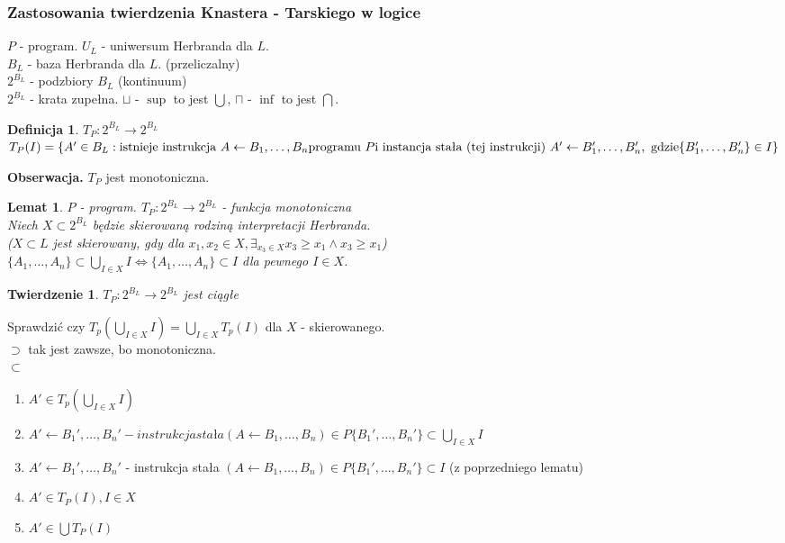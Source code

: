 \documentclass[10pt,a4paper]{article}
\theoremstyle{plain}
\newtheorem{theorem}{Twierdzenie}
\newtheorem{lemma}{Lemat}
\theoremstyle{definition}
\newtheorem*{definition}{Definicja}
\newcommand{\header}[1]{\noindent\textbf{#1}}
\begin{document}
\subsubsection{Zastosowania twierdzenia Knastera - Tarskiego w logice}
$P$ - program. $U_L$ - uniwersum Herbranda dla  $L$.\\
$B_L$ - baza Herbranda dla $L$. (przeliczalny)\\
$2^{B_L}$ - podzbiory $B_L$ (kontinuum)\\
$2^{B_L}$ - krata zupełna. $\sqcup$ - $\sup$ to jest $\bigcup$, $\sqcap$ - $\inf$ to jest $\bigcap$.\\
\begin{definition}
  $T_P : 2^{B_L} \rightarrow 2^{B_L}$
  $T_P(I) = \{A'\in B_L :
    \text{istnieje instrukcja } A\leftarrow B_1, \ldots, B_n \text{programu } P \\
  \text{i instancja stała (tej instrukcji) } A'\leftarrow B_1', \ldots, B_n', \text{ gdzie} \\
  \{B_1', \ldots, B_n' \} \in I \}$

\end{definition}
\header{Obserwacja.} $T_P$ jest monotoniczna.\\
\begin{lemma}
$P$ - program. $T_P : 2^{B_L} \rightarrow 2^{B_L}$ - funkcja monotoniczna\\
Niech $X \subset 2^{B_L}$ będzie skierowaną rodziną interpretacji Herbranda.\\
($X \subset L$ jest skierowany, gdy dla $x_1, x_2 \in X, \exists_{x_3\in X} x_3 \geq x_1 \wedge x_3 \geq x_1$)\\
$\{A_1, \ldots, A_n\} \subset \bigcup_{I\in X} I \iff \{A_1, \ldots, A_n \} \subset I$ dla pewnego $I\in X$.
\end{lemma}

\begin{theorem}
  $T_P : 2^{B_L} \rightarrow 2^{B_L}$ jest ciągłe
\end{theorem}
Sprawdzić czy $T_p(\bigcup_{I\in X} I) = \bigcup_{I\in X}T_p(I)$ dla $X$ - skierowanego.\\
$\supset$ tak jest zawsze, bo monotoniczna.\\
$\subset$
\begin{enumerate}
\item $A' \in T_p(\bigcup_{I\in X} I)$
\item $A' \leftarrow B_1', \ldots, B_n' - instrukcja stała (A \leftarrow B_1, \ldots, B_n) \in P \{B_1', \ldots, B_n' \} \subset \bigcup_{I\in X} I$
\item $A' \leftarrow B_1', \ldots, B_n'$ - instrukcja stała $(A \leftarrow B_1, \ldots, B_n) \in P \{B_1', \ldots, B_n' \} \subset I$ (z poprzedniego lematu)
\item $A' \in T_P(I), I\in X$
\item $A' \in \bigcup T_P(I)$
\end{enumerate}
\end{document}
